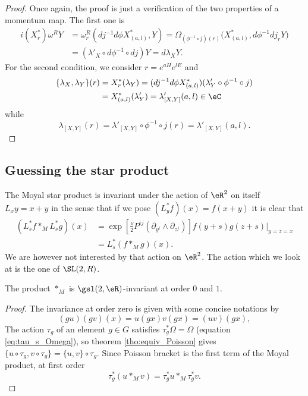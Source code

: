 \begin{proof}
Once again, the proof is just a verification of the two properties of a momentum map. The first one is
\begin{equation}
\begin{split}
  i(X^*_r)\omega^R Y&=\omega^R_r(dj^{-1} d\phi X^*_{(a,l)},Y)
        =\Omega_{(\phi^{-1}\circ j)(r)}\big( X^*_{(a,l)},d\phi^{-1} dj_r Y \big)\\
        &=(\lambda'_X\circ d\phi^{-1}\circ dj)Y
        =d\lambda_X Y.
\end{split}
\end{equation}
For the second condition, we consider $r=e^{aH}e^{lE}$ and
\begin{equation}
\begin{split}
  \{ \lambda_X,\lambda_Y \}(r)&=X^*_r(\lambda_Y)
        =(dj^{-1} d\phi X^*_{(a,l)})(\lambda'_Y\circ \phi^{-1}\circ j)\\
        &=X^*_{(a,l)}(\lambda'_Y)
        =\lambda'_{[X,Y]}(a,l)\in\eC
\end{split}
\end{equation}
while 
\[ 
  \lambda_{[X,Y]}(r)=\lambda'_{[X,Y]}\circ\phi^{-1}\circ j(r)=\lambda'_{[X,Y]}(a,l).
\]
\end{proof}

\subsection{Guessing the star product}

The Moyal star product is invariant under the action of $\eR^2$ on itself $L_xy=x+y$ in the sense that if we pose $(L_y^*f)(x)=f(x+y)$ it is clear that
\begin{equation}
\begin{split}
    (L_s^*f\ast_M L_s^*g)(x)&=
    \exp\left[{\displaystyle\frac{\nu}{2}P^{ij}(\partial_{y^i}\wedge\partial_{z^j})}\right]f(y+s)g(z+s)|_{y=z=x}\\
                        &=L^*_s(f\ast_M g)(x).
\end{split}
\end{equation}
We are however not interested by that action on $\eR^2$. The action which we look at is the one of $\SL(2,R)$.

\begin{proposition}
The product $\ast_M$ is $\gsl(2,\eR)$-invariant at order $0$ and $1$.
\end{proposition}

\begin{proof}
The invariance at order zero is given with some concise notations by
\[
 (gu)(gv)(x)=u(gx)v(gx)=(uv)(gx),
\]
The action $\tau_g$ of an element $g\in G$ satisfies $\tau_g^*\Omega=\Omega$ (equation \eqref{eq:tau_s_Omega}), so  theorem \ref{tho:equiv_Poisson} gives $\{u\circ\tau_g,v\circ\tau_g\}=\{u,v\}\circ\tau_g$.  Since Poisson bracket is the first term of the Moyal product, at first order
\[
  \tau_g^*(u\ast_M v)=\tau_g^*u\ast_M\tau_g^*v.
\]


\end{proof}

